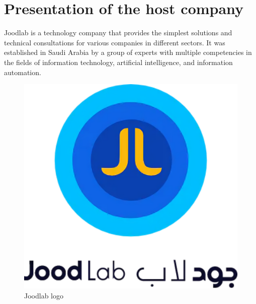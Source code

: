 \section{Presentation of the host company}

Joodlab is a technology company that provides the simplest solutions and technical consultations for various companies in different sectors. It was established in Saudi Arabia by a group of experts with multiple competencies in the fields of information technology, artificial intelligence, and information automation. 

\vspace{5pt}

\begin{figure}[ht]
    \centering
    \includegraphics[width=0.5\linewidth]{Images/logos/joodlab.png}
    \caption{Joodlab logo}
    \label{fig:Joodlab Logo}
\end{figure}



